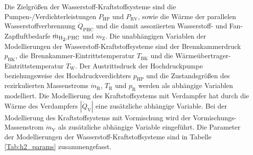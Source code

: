 Die Zielgrößen der Wasserstoff-Kraftstoffsysteme sind die Pumpen-/Verdichterleistungen $P_{\mathrm{HP}}$ und $P_{\mathrm{RV}}$, sowie die Wärme der parallelen Wasserstoffverbrennung $\dot{Q}_\mathrm{PHC}$ und die damit assoziierten Wasserstoff- und Fan-Zapfluftbedarfe $\dot{m}_\mathrm{H\textsubscript{2}, PHC}$ und $\dot{m}_\mathrm{Z}$. Die unabhängigen Variablen der Modellierungen der Wasserstoff-Kraftstoffsysteme sind der Brennkammerdruck $p_{\mathrm{BK}}$, die Brennkammer-Eintrittstemperatur $T_\mathrm{BK}$ und die Wärmeübertrager-Eintrittstemperatur $T_\mathrm{W}$. Der Austrittsdruck der Hochdruckpumpe beziehungsweise des Hochdruckverdichters $p_{\mathrm{HP}}$ und die Zustandsgrößen des rezirkulierten Massenstroms $\dot{m}_\mathrm{R}$, $T_\mathrm{R}$ und $p_\mathrm{R}$ werden als abhängige Variablen modelliert. Die Modellierung des Kraftstoffsystems mit Verdampfer hat durch die Wärme des Verdampfers $|\dot{Q}_\mathrm{V}|$ eine zusätzliche abhängige Variable. Bei der Modellierung des Kraftstoffsystems mit Vormischung wird der Vormischungs-Massenstrom $\dot{m}_\mathrm{V}$ als zusätzliche abhängige Variable eingeführt. Die Parameter der Modellierungen der Wasserstoff-Kraftstoffsysteme sind in Tabelle \ref{Tab:h2_params} zusammengefasst.

